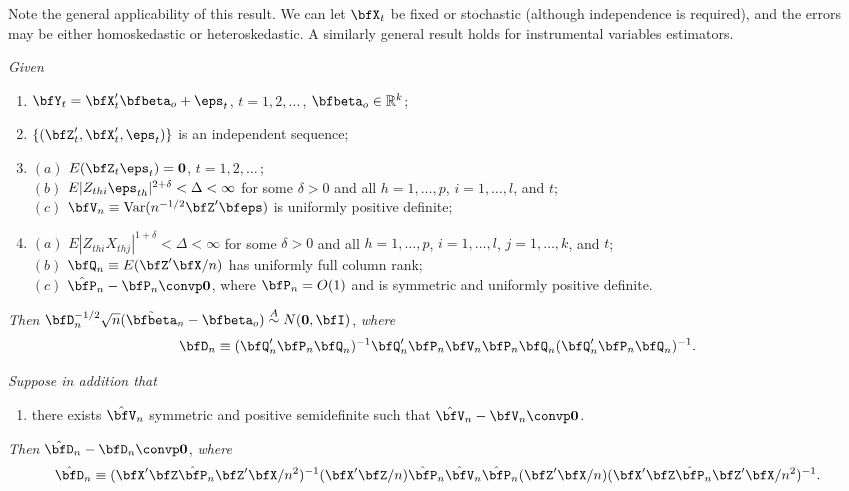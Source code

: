 Note the general applicability of this result. We can let $\bfX_t$ be fixed or stochastic (although independence is required), and the errors may be either homoskedastic or heteroskedastic. A similarly general result holds for instrumental variables estimators.

\begin{theorem}\label{thm:iv-ihd-clt}
\textit{Given}
\begin{enumerate}
\item[$(i)$] $\bfY_t = \bfX_t'\bfbeta_o + \eps_t$, \quad $t = 1, 2, \ldots$\,, $\bfbeta_o \in \mathbb{R}^k$;
\item[$(ii)$] $\{(\bfZ_t', \bfX_t', \eps_t)\}$ is an independent sequence;
\item[$(iii)$] $(a)$ $E(\bfZ_t \eps_t) = \mathbf{0}$, \quad $t = 1, 2, \ldots$\,;\\
$(b)$ $E|Z_{thi}\eps_{th}|^{2+\delta} < \Delta < \infty$ for some $\delta > 0$ and all $h = 1, \ldots, p$, $i = 1, \ldots, l$, and $t$;\\
$(c)$ $\bfV_n \equiv \Var(n^{-1/2}\bfZ'\bfeps)$ is uniformly positive definite;
\item[$(iv)$] $(a)$ $E|Z_{thi}X_{thj}|^{1+\delta} < \Delta < \infty$ for some $\delta > 0$ and all $h = 1, \ldots, p$, $i = 1, \ldots, l$, $j = 1, \ldots, k$, and $t$;\\
$(b)$ $\bfQ_n \equiv E(\bfZ'\bfX/n)$ has uniformly full column rank;\\
$(c)$ $\hat{\bfP}_n - \bfP_n \convp \mathbf{0}$, where $\bfP_n = O(1)$ and is symmetric and uniformly positive definite.
\end{enumerate}

\textit{Then} $\bfD_n^{-1/2}\sqrt{n}(\tilde{\bfbeta}_n - \bfbeta_o) \overset{A}{\sim} N(\mathbf{0}, \bfI)$, \textit{where}
\[
\bfD_n \equiv (\bfQ_n'\bfP_n\bfQ_n)^{-1}\bfQ_n'\bfP_n\bfV_n\bfP_n\bfQ_n(\bfQ_n'\bfP_n\bfQ_n)^{-1}.
\]

\textit{Suppose in addition that}

\begin{enumerate}
\item[$(v)$] there exists $\hat{\bfV}_n$ symmetric and positive semidefinite such that $\hat{\bfV}_n - \bfV_n \convp \mathbf{0}$.
\end{enumerate}

\textit{Then} $\hat{\bfD}_n - \bfD_n \convp \mathbf{0}$, \textit{where}
\[
\hat{\bfD}_n \equiv (\bfX'\bfZ\hat{\bfP}_n\bfZ'\bfX/n^2)^{-1}(\bfX'\bfZ/n)\hat{\bfP}_n\hat{\bfV}_n\hat{\bfP}_n(\bfZ'\bfX/n)(\bfX'\bfZ\hat{\bfP}_n\bfZ'\bfX/n^2)^{-1}.
\]
\end{theorem}

